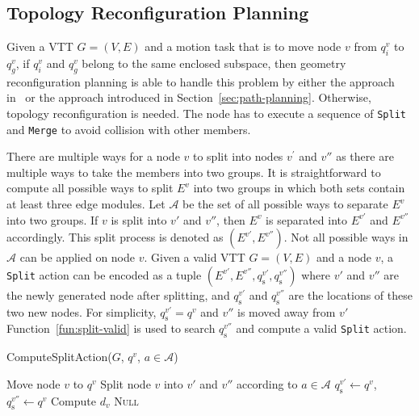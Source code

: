 \documentclass[journal]{IEEEtran}
\begin{document}
\subsection{Topology Reconfiguration Planning}
\label{sec:topology-planning}

Given a VTT $G = (V, E)$ and a motion task that is to move node $v$
from $q_i^v$ to $q_g^v$, if $q_i^v$ and $q_g^v$ belong to the same
enclosed subspace, then geometry reconfiguration planning is able to
handle this problem by either the approach
in~\cite{Liu-vtt-cspace-icra-2020} or the approach introduced in
Section~\ref{sec:path-planning}. Otherwise, topology reconfiguration
is needed. The node has to execute a sequence of \texttt{Split} and
\texttt{Merge} to avoid collision with other members.

There are multiple ways for a node $v$ to split into nodes $v^\prime$
and $v''$ as there are multiple ways to take the members into two
groups.  It is straightforward to compute all possible ways to split
$E^v$ into two groups in which both sets contain at least three edge
modules. Let $\mathcal{A}$ be the set of all possible ways to separate
$E^v$ into two groups. If $v$ is split into $v'$ and $v''$, then $E^v$
is separated into $E^{v'}$ and $E^{v''}$ accordingly. This split
process is denoted as $(E^{v'}, E^{v''})$. Not all possible ways in
$\mathcal{A}$ can be applied on node $v$. Given a valid VTT $G=(V,E)$
and a node $v$, a \texttt{Split} action can be encoded as a tuple
$(E^{v'}, E^{v''}, q_{\mathrm{s}}^{v'}, q_{\mathrm{s}}^{v''})$ where
$v'$ and $v''$ are the newly generated node after splitting, and
$q_{\mathrm{s}}^{v'}$ and $q_{\mathrm{s}}^{v''}$ are the locations of
these two new nodes. For simplicity, $q_{\mathrm{s}}^{v'} = q^v$ and
$v''$ is moved away from $v'$ Function~\ref{fun:split-valid} is used
to search $q_{\mathrm{s}}^{v''}$ and compute a valid \texttt{Split}
action.

\begin{function}[t!]
  \caption{ComputeSplitAction($G$, $q^v$, $a \in \mathcal{A}$)}\label{fun:split-valid}
  Move node $v$ to $q^v$\;
  Split node $v$ into $v'$ and $v''$ according to $a\in \mathcal{A}$\;
  $q_{\mathrm{s}}^{v'}\leftarrow q^v$, $q_{\mathrm{s}}^{v''}\leftarrow q^v$\;
  Compute $d_v$\;
  \KwRet \textsc{Null}\;
\end{function}
\end{document}
